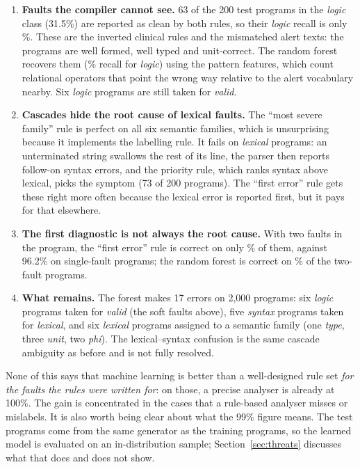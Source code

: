 \documentclass[conference]{IEEEtran}
\begin{document}
\begin{enumerate}
    \item \textbf{Faults the compiler cannot see.} 63 of the 200 test programs in the \emph{logic} class (31.5\%) are
    reported as clean by both rules, so their \emph{logic} recall is only \RuleLogicRecall\%. These are the inverted
    clinical rules and the mismatched alert texts: the programs are well formed, well typed and unit-correct. The random
    forest recovers them (\RFLogicRecall\% recall for \emph{logic}) using the pattern features, which count relational
    operators that point the wrong way relative to the alert vocabulary nearby. Six \emph{logic} programs are still
    taken for \emph{valid}.
    \item \textbf{Cascades hide the root cause of lexical faults.} The ``most severe family'' rule is perfect on all six
    semantic families, which is unsurprising because it implements the labelling rule. It fails on \emph{lexical}
    programs: an unterminated string swallows the rest of its line, the parser then reports follow-on syntax errors, and
    the priority rule, which ranks syntax above lexical, picks the symptom (73 of 200 programs). The ``first error''
    rule gets these right more often because the lexical error is reported first, but it pays for that elsewhere.
    \item \textbf{The first diagnostic is not always the root cause.} With two faults in the program, the ``first error''
    rule is correct on only \RuleFirstDouble\% of them, against 96.2\% on single-fault programs; the random forest is correct on
    \RFDouble\% of the two-fault programs.
    \item \textbf{What remains.} The forest makes 17 errors on 2{,}000 programs: six \emph{logic} programs taken for
    \emph{valid} (the soft faults above), five \emph{syntax} programs taken for \emph{lexical}, and six \emph{lexical}
    programs assigned to a semantic family (one \emph{type}, three \emph{unit}, two \emph{phi}). The lexical--syntax
    confusion is the same cascade ambiguity as before and is not fully resolved.
\end{enumerate}

None of this says that machine learning is better than a well-designed rule set \emph{for the faults the rules were
written for}: on those, a precise analyser is already at 100\%. The gain is concentrated in the cases that a
rule-based analyser misses or mislabels. It is also worth being clear about what the 99\% figure means. The test programs
come from the same generator as the training programs, so the learned model is evaluated on an in-distribution
sample; Section~\ref{sec:threats} discusses what that does and does not show.
\end{document}
